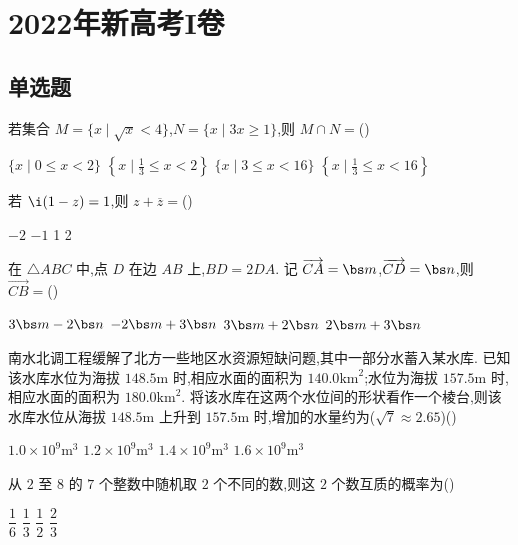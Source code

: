 \chapter{2022年新高考I卷}

\section{单选题}

\begin{problem}
若集合 \(M=\{x\mid \sqrt{x}<4\}\),\(N=\{x\mid 3x\ge 1\}\),则 \(M\cap N=\)(\quad)

\choices
    {\(\{x\mid 0\le x<2\}\)}
    {\(\left\{x\mid \frac13\le x<2\right\}\)}
    {\(\{x\mid 3\le x<16\}\)}
    {\(\left\{x\mid \frac13\le x<16\right\}\)}
\end{problem}

\begin{problem}
若 \(\i(1-z)=1\),则 \(z+\overline{z}=\)(\quad)

\choices
    {\(-2\)}
    {\(-1\)}
    {1}
    {2}
\end{problem}

\begin{problem}
在 \(\triangle ABC\) 中,点 \(D\) 在边 \(AB\) 上,\(BD=2DA\). 记 \(\overrightarrow{CA}=\bs m\),\(\overrightarrow{CD}=\bs n\),则 \(\overrightarrow{CB}=\)(\quad)

\choices
    {\(3\bs m-2\bs n\)}
    {\(-2\bs m+3\bs n\)}
    {\(3\bs m+2\bs n\)}
    {\(2\bs m+3\bs n\)}
\end{problem}

\begin{problem}
南水北调工程缓解了北方一些地区水资源短缺问题,其中一部分水蓄入某水库. 已知该水库水位为海拔 \(148.5\text{m}\) 时,相应水面的面积为 \(140.0\text{km}^2\);水位为海拔 \(157.5\text{m}\) 时,相应水面的面积为 \(180.0\text{km}^2\). 将该水库在这两个水位间的形状看作一个棱台,则该水库水位从海拔 \(148.5\text{m}\) 上升到 \(157.5\text{m}\) 时,增加的水量约为(\(\sqrt7\approx 2.65\))(\quad)

\choices
    {\(1.0\times 10^9\text{m}^3\)}
    {\(1.2\times 10^9\text{m}^3\)}
    {\(1.4\times 10^9\text{m}^3\)}
    {\(1.6\times 10^9\text{m}^3\)}
\end{problem}

\begin{problem}
从 \(2\) 至 \(8\) 的 \(7\) 个整数中随机取 \(2\) 个不同的数,则这 \(2\) 个数互质的概率为(\quad)

\choices
    {\(\dfrac16\)}
    {\(\dfrac13\)}
    {\(\dfrac12\)}
    {\(\dfrac23\)}
\end{problem}

